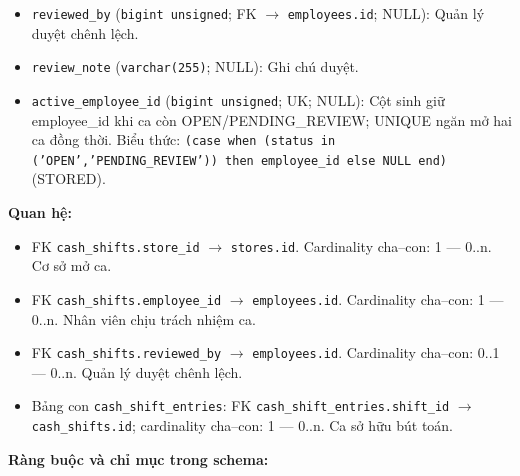 \begin{itemize}
\item \texttt{reviewed\_by} (\texttt{bigint unsigned}; FK $\rightarrow$ \texttt{employees.id}; NULL): Quản lý duyệt chênh lệch.

\item \texttt{review\_note} (\texttt{varchar(255)}; NULL): Ghi chú duyệt.

\item \texttt{active\_employee\_id} (\texttt{bigint unsigned}; UK; NULL): Cột sinh giữ employee_id khi ca còn OPEN/PENDING_REVIEW; UNIQUE ngăn mở hai ca đồng thời. Biểu thức: \texttt{(case when (status in ('OPEN','PENDING\_REVIEW')) then employee\_id else NULL end)} (STORED).

\end{itemize}

\textbf{Quan hệ:}

\begin{itemize}

\item FK \texttt{cash\_shifts.store\_id} $\rightarrow$ \texttt{stores.id}. Cardinality cha--con: 1 — 0..n. Cơ sở mở ca.

\item FK \texttt{cash\_shifts.employee\_id} $\rightarrow$ \texttt{employees.id}. Cardinality cha--con: 1 — 0..n. Nhân viên chịu trách nhiệm ca.

\item FK \texttt{cash\_shifts.reviewed\_by} $\rightarrow$ \texttt{employees.id}. Cardinality cha--con: 0..1 — 0..n. Quản lý duyệt chênh lệch.

\item Bảng con \texttt{cash\_shift\_entries}: FK \texttt{cash\_shift\_entries.shift\_id} $\rightarrow$ \texttt{cash\_shifts.id}; cardinality cha--con: 1 — 0..n. Ca sở hữu bút toán.

\end{itemize}

\textbf{Ràng buộc và chỉ mục trong schema:}

